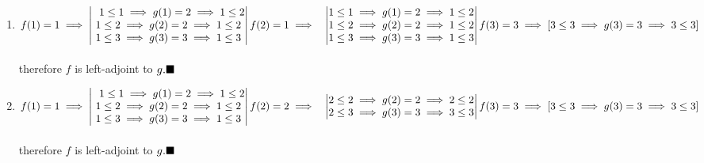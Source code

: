 \documentclass{article}
\begin{document}
\begin{enumerate}
	\item $f(1)=1\implies 
\begin{vmatrix} \ \ 
	1\leq 1\implies g(1)=2\implies 1\leq 2\\
	1\leq 2\implies g(2)=2\implies 1\leq 2\\
	1\leq 3\implies g(3)=3\implies 1\leq 3
\end{vmatrix}\\
 \\
f(2)=1\implies \ \ 
\begin{vmatrix}
	1\leq 1\implies g(1)=2\implies 1\leq 2\\
	1\leq 2\implies g(2)=2\implies 1\leq 2\\
	1\leq 3\implies g(3)=3\implies 1\leq 3
\end{vmatrix}\\
f(3)=3\implies \left[ 3\leq 3\implies g(3)=3\implies 3\leq 3\right]
$\\
 \\
therefore $f$ is left-adjoint to $g.\hfill\blacksquare$
\item $f(1)=1\implies 
\begin{vmatrix} \ \ 
	1\leq 1\implies g(1)=2\implies 1\leq 2\\
	1\leq 2\implies g(2)=2\implies 1\leq 2\\
	1\leq 3\implies g(3)=3\implies 1\leq 3
\end{vmatrix}\\
 \\
f(2)=2\implies \ \ 
\begin{vmatrix}
	2\leq 2\implies g(2)=2\implies 2\leq 2\\
	2\leq 3\implies g(3)=3\implies 3\leq 3
\end{vmatrix}\\
 \\
f(3)=3\implies \left[ 3\leq 3\implies g(3)=3\implies 3\leq 3\right]
$\\
 \\
therefore $f$ is left-adjoint to $g.\hfill\blacksquare$
\end{enumerate}
 \newpage
\end{document}
